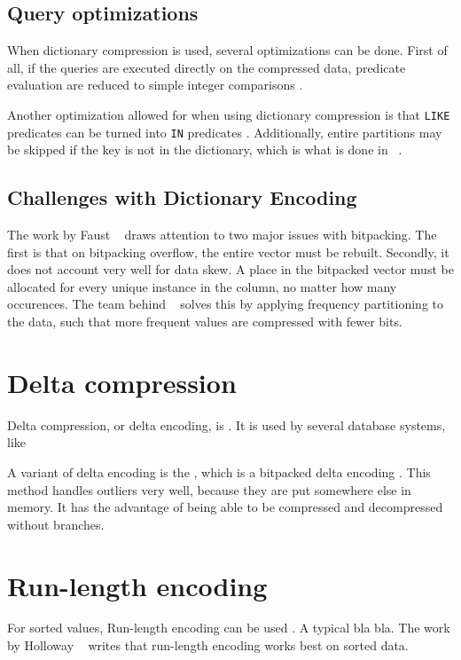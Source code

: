 \subsection{Query optimizations}
\label{sub:Query optimizations}
When dictionary compression is used, several optimizations can be done. First of all, if the queries are executed directly on the compressed data, predicate evaluation are reduced to simple integer comparisons \cite{Johnson2008-cp}.  

Another optimization allowed for when using dictionary compression is that \texttt{LIKE} predicates can be turned into \texttt{IN} predicates \cite{Barber2012-xt}. Additionally, entire partitions may be skipped if the key is not in the dictionary, which is what is done in \blink~\cite{Barber2012-xt}.

\subsection{Challenges with Dictionary Encoding}
\label{sub:Challenges with Dictionary Encoding}
The work by Faust \ea~\cite{Faust2015-ke} draws attention to two major issues with bitpacking. The first is that on bitpacking overflow, the entire vector must be rebuilt. Secondly, it does not account very well for data skew. A place in the bitpacked vector must be allocated for every unique instance in the column, no matter how many occurences. The team behind \blink~\cite{Raman2008-gi} solves this by applying frequency partitioning to the data, such that more frequent values are compressed with fewer bits.

\section{Delta compression}
\label{sec:Delta compression}
Delta compression, or delta encoding, is . It is used by several database systems, like ~\cite{Raman2008-gi}

A variant of delta encoding is the , which is a bitpacked delta encoding \cite{Bjorklund2011-wh}. This method handles outliers very well, because they are put somewhere else in memory. It has the advantage of being able to be compressed and decompressed without branches.

\section{Run-length encoding}
\label{sec:Run-length encoding}
For sorted values, Run-length encoding can be used \cite{Bjorklund2011-wh}. A typical bla bla. The work by Holloway \ea~\cite{Holloway2008-rr} writes that run-length encoding works best on sorted data.

